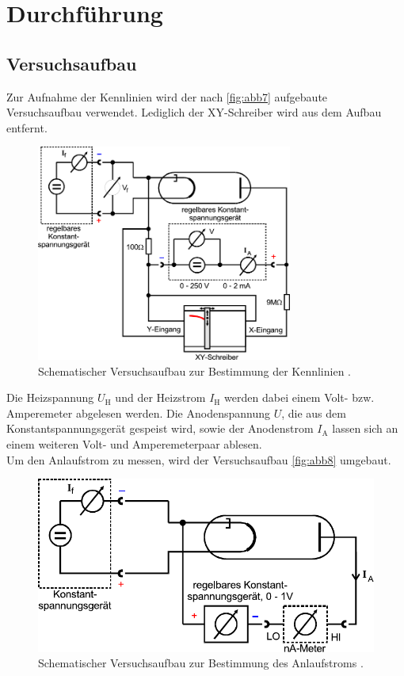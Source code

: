 \section{Durchführung}
\label{sec:Durchführung}


\subsection{Versuchsaufbau}

Zur Aufnahme der Kennlinien wird der nach \autoref{fig:abb7} aufgebaute Versuchsaufbau verwendet. 
Lediglich der XY-Schreiber wird aus dem Aufbau entfernt.

\begin{figure}[H]
    \centering
    \includegraphics[width = 0.75\textwidth]{figures/Abb7.pdf}
    \caption{Schematischer Versuchsaufbau zur Bestimmung der Kennlinien \cite{ap09}.}
    \label{fig:abb7}
\end{figure}

Die Heizspannung $U_\text{H}$ und der Heizstrom $I_\text{H}$ werden dabei einem Volt- bzw. Amperemeter abgelesen werden.
Die Anodenspannung $U$, die aus dem Konstantspannungsgerät gespeist wird, sowie der Anodenstrom $I_\text{A}$ lassen sich an einem weiteren Volt- und Amperemeterpaar ablesen. \\

Um den Anlaufstrom zu messen, wird der Versuchsaufbau \autoref{fig:abb8} umgebaut.

\begin{figure}[H]
    \centering
    \includegraphics{figures/Abb8.pdf}
    \caption{Schematischer Versuchsaufbau zur Bestimmung des Anlaufstroms \citeyear{ap09}.}
    \label{fig:abb8}
\end{figure}



